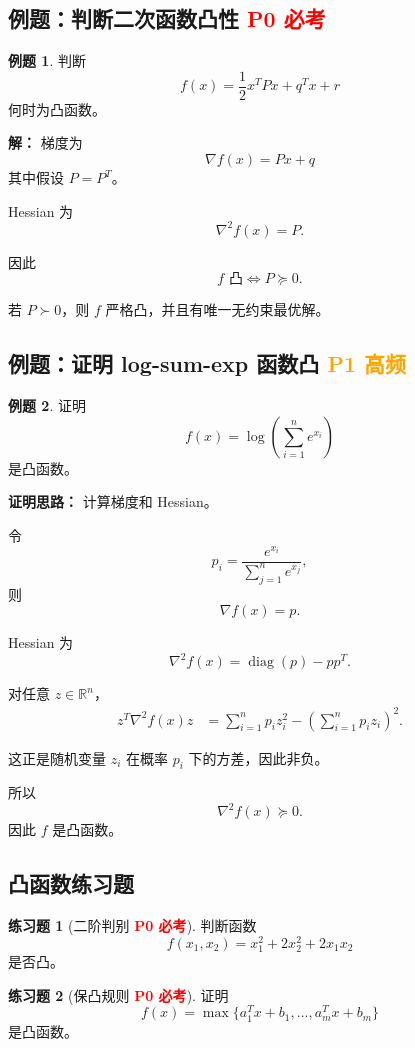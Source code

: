 \documentclass[11pt,a4paper]{ctexart}
\newcommand{\R}{\mathbb{R}}
\newcommand{\diag}{\operatorname{diag}}
\newcommand{\Pzero}{\textcolor{red}{\textbf{P0 必考}}}
\newcommand{\Pone}{\textcolor{orange}{\textbf{P1 高频}}}
\theoremstyle{definition}
\newtheorem{example}{例题}[section]
\newtheorem{exercise}{练习题}[section]
\theoremstyle{plain}
\theoremstyle{remark}
\begin{document}
\subsection{例题：判断二次函数凸性 \Pzero}

\begin{example}
判断
\[
    f(x)=\frac12 x^TPx+q^Tx+r
\]
何时为凸函数。

\textbf{解：}
梯度为
\[
    \nabla f(x)=Px+q
\]
其中假设 $P=P^T$。

Hessian 为
\[
    \nabla^2 f(x)=P.
\]

因此
\[
    f \text{ 凸}
    \Longleftrightarrow
    P\succeq0.
\]

若 $P\succ0$，则 $f$ 严格凸，并且有唯一无约束最优解。
\end{example}

\subsection{例题：证明 log-sum-exp 函数凸 \Pone}

\begin{example}
证明
\[
    f(x)=\log\left(\sum_{i=1}^n e^{x_i}\right)
\]
是凸函数。

\textbf{证明思路：}
计算梯度和 Hessian。

令
\[
    p_i=\frac{e^{x_i}}{\sum_{j=1}^n e^{x_j}},
\]
则
\[
    \nabla f(x)=p.
\]

Hessian 为
\[
    \nabla^2 f(x)
    =
    \diag(p)-pp^T.
\]

对任意 $z\in\R^n$，
\[
\begin{aligned}
    z^T\nabla^2 f(x)z
    &=
    \sum_{i=1}^n p_i z_i^2
    -
    \left(\sum_{i=1}^n p_i z_i\right)^2.
\end{aligned}
\]

这正是随机变量 $z_i$ 在概率 $p_i$ 下的方差，因此非负。

所以
\[
    \nabla^2 f(x)\succeq0.
\]
因此 $f$ 是凸函数。
\end{example}

\subsection{凸函数练习题}

\begin{exercise}[二阶判别 \Pzero]
判断函数
\[
    f(x_1,x_2)=x_1^2+2x_2^2+2x_1x_2
\]
是否凸。
\end{exercise}

\begin{exercise}[保凸规则 \Pzero]
证明
\[
    f(x)=\max\{a_1^Tx+b_1,\dots,a_m^Tx+b_m\}
\]
是凸函数。
\end{exercise}
\end{document}

